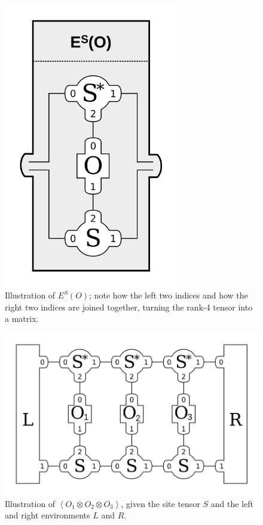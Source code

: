 \documentclass{article}
\begin{document}
\begin{figure}
\centering
\includegraphics[width=3in]{drawings/E-O-matrix-car}
\caption{\label{fig:E-O-matrix} Illustration of $E^S(O)$; note how the left two indices and how the right two indices are joined together, turning the rank-4 tensor into a matrix.}
\end{figure}

\begin{figure}
\centering
\includegraphics[width=\textwidth]{drawings/E-Os-matrix-car}
\caption{\label{fig:E-Os-matrix} Illustration of $\left<O_1\otimes O_2\otimes O_3\right>$, given the site tensor $S$ and the left and right environments $L$ and $R$.}
\end{figure}
\end{document}

